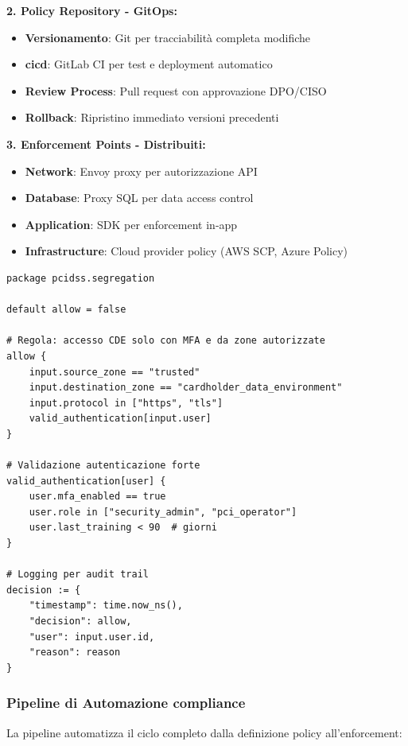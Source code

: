 \textbf{2. Policy Repository - GitOps:}
\begin{itemize}
    \item \textbf{Versionamento}: Git per tracciabilità completa modifiche
    \item \textbf{\gls{cicd}}: GitLab CI per test e deployment automatico
    \item \textbf{Review Process}: Pull request con approvazione DPO/CISO
    \item \textbf{Rollback}: Ripristino immediato versioni precedenti
\end{itemize}

\textbf{3. Enforcement Points - Distribuiti:}
\begin{itemize}
    \item \textbf{Network}: Envoy proxy per autorizzazione API
    \item \textbf{Database}: Proxy SQL per data access control
    \item \textbf{Application}: SDK per enforcement in-app
    \item \textbf{Infrastructure}: Cloud provider policy (AWS SCP, Azure Policy)
\end{itemize}

\begin{lstlisting}[caption={Policy Rego per Segregazione Dati PCI},label={lst:rego_pci}]
package pcidss.segregation

default allow = false

# Regola: accesso CDE solo con MFA e da zone autorizzate
allow {
    input.source_zone == "trusted"
    input.destination_zone == "cardholder_data_environment"
    input.protocol in ["https", "tls"]
    valid_authentication[input.user]
}

# Validazione autenticazione forte
valid_authentication[user] {
    user.mfa_enabled == true
    user.role in ["security_admin", "pci_operator"]
    user.last_training < 90  # giorni
}

# Logging per audit trail
decision := {
    "timestamp": time.now_ns(),
    "decision": allow,
    "user": input.user.id,
    "reason": reason
}
\end{lstlisting}

\subsubsection{\texorpdfstring{Pipeline di Automazione \gls{compliance}}{4.4.2.2 - Pipeline di Automazione Compliance}}

La pipeline automatizza il ciclo completo dalla definizione policy all'enforcement:

